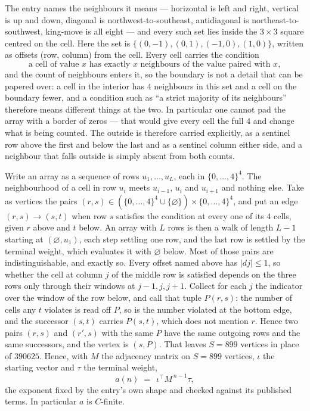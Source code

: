 \documentclass[11pt,a4paper]{article}
\theoremstyle{plain}
\theoremstyle{definition}
\begin{document}
The entry names the neighbours it means --- horizontal is left and right, vertical is up and
down, diagonal is northwest-to-southeast, antidiagonal is northeast-to-southwest, king-move is
all eight --- and every such set lies inside the $3\times3$ square centred on the cell. Here
the set is $\{(0,-1), (0,1), (-1,0), (1,0)\}$, written as offsets (row, column) from the cell. Every cell carries
the condition
\[
\text{a cell of value }x\text{ has exactly }x\text{ neighbours of the value paired with }x,
\]
and the count of neighbours enters it, so the boundary is not a detail that can be papered
over: a cell in the interior has $4$ neighbours in this set and a cell on the boundary
fewer, and a condition such as ``a strict majority of its neighbours'' therefore means
different things at the two. In particular one cannot pad the array with a border of zeros ---
that would give every cell the full $4$ and change what is being counted. The outside is
therefore carried
explicitly, as a sentinel row above the first and below the last and as a sentinel column
either side, and a neighbour that falls outside is simply absent from both counts.

Write an array as a sequence of rows $u_1,\dots,u_L$, each in
$\{0,\dots,4\}^{4}$. The neighbourhood of a cell in row $u_i$ meets $u_{i-1}$,
$u_i$ and $u_{i+1}$ and nothing else. Take as vertices the pairs
$(r,s)\in(\{0,\dots,4\}^{4}\cup\{\varnothing\})\times\{0,\dots,4\}^{4}$,
and put an edge $(r,s)\to(s,t)$ when row $s$ satisfies the condition at every one of its
$4$ cells, given $r$ above and $t$ below. An array with $L$ rows is then a walk of length
$L-1$ starting at $(\varnothing,u_1)$, each step settling one row, and the last row is
settled by the terminal weight, which evaluates it with $\varnothing$ below. Most of those pairs are indistinguishable, and exactly so. Every offset named above has $|dj|\le 1$, so whether the cell at column $j$ of the middle row is satisfied depends on the three rows only through their windows at $j-1,j,j+1$. Collect for each $j$ the indicator over the window of the row below, and call that tuple $P(r,s)$: the number of cells any $t$ violates is read off $P$, so is the number violated at the bottom edge, and the successor $(s,t)$ carries $P(s,t)$, which does not mention $r$. Hence two pairs $(r,s)$ and $(r',s)$ with the same $P$ have the same outgoing rows and the same successors, and the vertex is $(s,P)$. That leaves $S=899$ vertices in place of $390625$. Hence,
with $M$ the adjacency matrix on $S=899$ vertices, $\iota$ the starting vector and $\tau$ the
terminal weight,
\[
a(n)\;=\;\,\iota^{\!\top}M^{\,n-1}\tau ,
\]
the exponent fixed by the entry's own shape and checked against its published terms. In
particular $a$ is $C$-finite.
\end{document}
